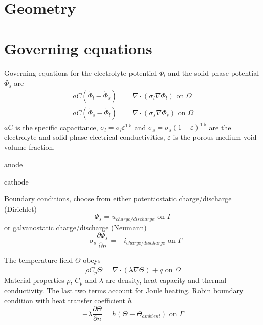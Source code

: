 \documentclass[10pt, oneside]{article}   	%
\begin{document}
\section{Geometry}

\section{Governing equations}
Governing equations for the electrolyte potential $\Phi_l$ and the solid phase
potential $\Phi_s$ are
\begin{align}
aC (\dot{\Phi}_l - \dot{\Phi}_s) &= \nabla \cdot (\sigma_l \nabla \Phi_l) \text{ on } \Omega \\
aC (\dot{\Phi}_s - \dot{\Phi}_l) &= \nabla \cdot (\sigma_s \nabla \Phi_s) \text{ on } \Omega
\end{align}
$aC$ is the specific capacitance, 
$\sigma_l=\sigma_l\varepsilon^{1.5}$ and $\sigma_s=\sigma_s(1-\varepsilon)^{1.5}$ 
are the electrolyte and solid phase electrical conductivities, 
$\varepsilon$ is the porous medium void volume fraction.

anode 

cathode

Boundary conditions, choose from either potentiostatic charge/discharge
(Dirichlet)
\begin{equation}
\Phi_s = u_{charge/discharge} \text{ on } \Gamma
\end{equation}
or galvanostatic charge/discharge (Neumann)
\begin{equation}
- \sigma_s \frac{\partial \Phi_s}{\partial n} = \pm i_{charge/discharge} \text{ on } \Gamma
\end{equation}

The temperature field $\Theta$ obeys
\begin{equation}
\rho C_p \dot{\Theta} = \nabla \cdot (\lambda \nabla \Theta) + q \text{ on } \Omega
\end{equation}
Material properties $\rho$, $C_p$ and $\lambda$ are density, heat capacity and
thermal conductivity.
The last two terms account for Joule heating.
Robin boundary condition with heat transfer coefficient $h$
\begin{equation}
- \lambda \frac{\partial \Theta}{\partial n} = h (\Theta - \Theta_{ambient}) \text{ on } \Gamma
\end{equation}
\end{document}
